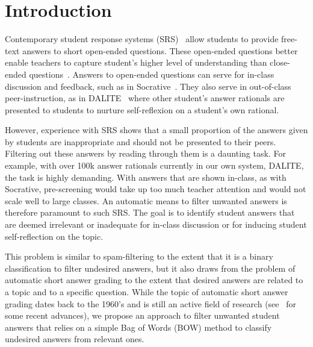 \documentclass{edm_template}
\newcommand{\dalite}{DALITE}
\begin{document}

\section{Introduction}

Contemporary student response systems (SRS)~\cite{kaleta2007student,farris2017using} allow students to provide free-text answers to short open-ended questions.  These open-ended questions better enable teachers to capture student's higher level of understanding than close-ended questions~\cite{reilly2014scoring}.  Answers to open-ended questions can serve for in-class discussion and feedback, such as in Socrative~\cite{nawalaniec2015socrative}.  They also serve in out-of-class peer-instruction, as in \dalite~\cite{bhatnagar2016dalite} where other student's answer rationals are presented to students to nurture self-reflexion on a student's own rational.  

However, experience with SRS shows that a small proportion of the answers given by students are inappropriate and should not be presented to their peers.  Filtering out these answers by reading through them is a daunting task.  For example, with over 100k answer rationals currently in our own system, \dalite, the task is highly demanding.  With answers that are shown in-class, as with Socrative, pre-screening would take up too much teacher attention and would not scale well to large classes.  An automatic means to filter unwanted answers is therefore paramount to such SRS.  The goal is to identify student answers that are deemed irrelevant or inadequate for in-class discussion or for inducing student self-reflection on the topic.

This problem is similar to spam-filtering to the extent that it is a binary classification to filter undesired answers, but it also draws from the problem of automatic short answer grading to the extent that desired answers are related to a topic and to a specific question.  While the topic of automatic short answer grading dates back to the 1960's and is still an active field of research (see~\cite{galhardi2018machine,mcdonald2017short,sultan2016fast} for some recent advances), we propose an approach to filter unwanted student answers that relies on a simple Bag of Words (BOW) method to classify undesired answers from relevant ones.

\end{document}
